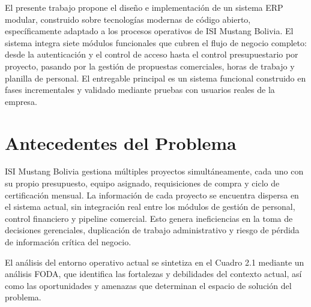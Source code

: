 \documentclass{univalle-perfil}
\begin{document}
El presente trabajo propone el diseño e implementación de un sistema ERP modular, construido sobre tecnologías modernas de código abierto, específicamente adaptado a los procesos operativos de ISI Mustang Bolivia. El sistema integra siete módulos funcionales que cubren el flujo de negocio completo: desde la autenticación y el control de acceso hasta el control presupuestario por proyecto, pasando por la gestión de propuestas comerciales, horas de trabajo y planilla de personal. El entregable principal es un sistema funcional construido en fases incrementales y validado mediante pruebas con usuarios reales de la empresa.

\section{Antecedentes del Problema}

ISI Mustang Bolivia gestiona múltiples proyectos simultáneamente, cada uno con su propio presupuesto, equipo asignado, requisiciones de compra y ciclo de certificación mensual. La información de cada proyecto se encuentra dispersa en el sistema actual, sin integración real entre los módulos de gestión de personal, control financiero y pipeline comercial. Esto genera ineficiencias en la toma de decisiones gerenciales, duplicación de trabajo administrativo y riesgo de pérdida de información crítica del negocio.

El análisis del entorno operativo actual se sintetiza en el Cuadro 2.1 mediante un análisis FODA, que identifica las fortalezas y debilidades del contexto actual, así como las oportunidades y amenazas que determinan el espacio de solución del problema.
\end{document}
